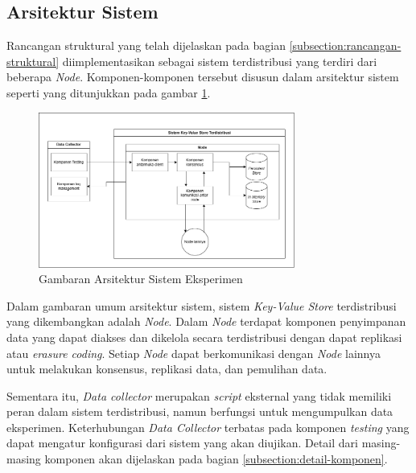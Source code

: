 \subsection{Arsitektur Sistem}
\label{subsection:system-architecture}

Rancangan struktural yang telah dijelaskan pada bagian \ref{subsection:rancangan-struktural} diimplementasikan sebagai sistem terdistribusi yang terdiri dari beberapa \textit{Node}. Komponen-komponen tersebut disusun dalam arsitektur sistem seperti yang ditunjukkan pada gambar \ref{fig:general-architecture}.

\begin{figure}[ht]
    \centering
    \includegraphics[width=0.75\textwidth]{resources/chapter-3/general-architecture.png}
    \caption{Gambaran Arsitektur Sistem Eksperimen}
    \label{fig:general-architecture}
\end{figure}

Dalam gambaran umum arsitektur sistem, sistem \textit{Key-Value Store} terdistribusi yang dikembangkan adalah \textit{Node}. Dalam \textit{Node} terdapat komponen penyimpanan data yang dapat diakses dan dikelola secara terdistribusi dengan dapat replikasi atau \textit{erasure coding}. Setiap \textit{Node} dapat berkomunikasi dengan \textit{Node} lainnya untuk melakukan konsensus, replikasi data, dan pemulihan data.

Sementara itu, \textit{Data collector} merupakan \textit{script} eksternal yang tidak memiliki peran dalam sistem terdistribusi, namun berfungsi untuk mengumpulkan data eksperimen. Keterhubungan \textit{Data Collector} terbatas pada komponen \textit{testing} yang dapat mengatur konfigurasi dari sistem yang akan diujikan. Detail dari masing-masing komponen akan dijelaskan pada bagian \ref{subsection:detail-komponen}. 


